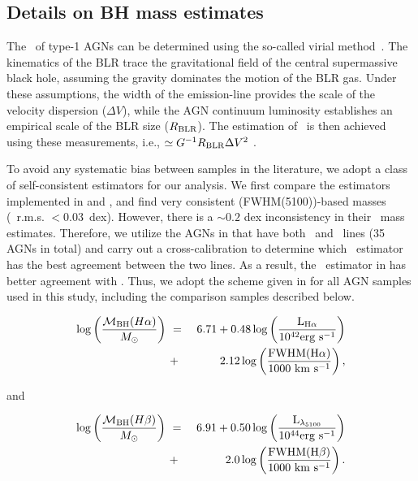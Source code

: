 \documentclass[apj]{emulateapj}
\begin{document}
\subsection{Details on BH mass estimates}
\label{mbh}

The \mbh\ of type-1 AGNs can be determined using the so-called virial method~\citep{Peterson2004, Shen2013}. The kinematics of the BLR trace the gravitational field of the central supermassive black hole, assuming the gravity dominates the motion of the BLR gas. Under these assumptions, the width of the emission-line provides the scale of the velocity dispersion ($\Delta V$), while the AGN continuum luminosity establishes an empirical scale of the BLR size ($R_{\rm BLR}$). The estimation of \mbh\ is then achieved using these measurements, i.e., \mbh$\simeq G^{-1} R_{\rm BLR} \Delta V^2$ \citep{McLure2004}.

To avoid any systematic bias between samples in the literature, we adopt a class of self-consistent estimators for our analysis. We first compare the estimators implemented in \citet{Schulze2018} and \citet{Ding2017b}, and find very consistent \hbeta(FWHM(5100))-based masses (\mbh\ r.m.s. $<0.03$~dex). However, there is a $\sim0.2$ dex inconsistency in their \halpha\ mass estimates. Therefore, we utilize the AGNs in \citet{Schulze2018} that have both \halpha\ and \hbeta\ lines (35 AGNs in total) and carry out a cross-calibration to determine which \halpha\ estimator has the best agreement between the two lines. As a  result, the \halpha\ estimator in \citet{Schulze2018} has better agreement with \hbeta. Thus, we adopt the scheme given in \citet{Schulze2018} for all AGN samples used in this study, including the comparison samples described below.

\begin{eqnarray}
\label{eq:Ha}
\log \left(\frac{\mathcal M_{\rm BH} (H\alpha)}{M_{\odot}}\right)&~=~& 6.71+0.48 \log \left(\frac{ \rm L _{H\alpha}}{10^{42}{\rm erg~s^{-1}}}\right) \nonumber\\
&~+~& 2.12 \log \left(\frac{\rm FWHM(H\alpha)}{1000 ~{\rm km~s^{-1}}}\right) ,
\end {eqnarray}

and

\begin{eqnarray}
\label{eq:Hb}
\log \left(\frac{\mathcal M_{\rm BH}(H\beta) }{M_{\odot}}\right)&~=~& 6.91+0.50\log \left(\frac{ \rm L _{\lambda_{5100}}}{10^{44}{\rm erg~s^{-1}}}\right) \nonumber\\
&~+~& 2.0 \log \left(\frac{\rm FWHM(H\beta)}{1000 ~{\rm km~s^{-1}}}\right) .
\end {eqnarray}
\end{document}
